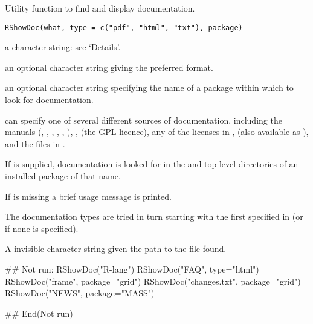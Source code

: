 %
\begin{Description}\relax
Utility function to find and display \R{} documentation.
\end{Description}
%
\begin{Usage}
\begin{verbatim}
RShowDoc(what, type = c("pdf", "html", "txt"), package)
\end{verbatim}
\end{Usage}
%
\begin{Arguments}
\begin{ldescription}
\item[\code{what}] a character string: see `Details'.
\item[\code{type}] an optional character string giving the preferred format.
\item[\code{package}] an optional character string specifying the name of a
package within which to look for documentation.
\end{ldescription}
\end{Arguments}
%
\begin{Details}\relax
{} can specify one of several different sources of documentation,
including the \R{} manuals (, , ,
, , ), ,
 (the GPL licence), any of the licenses in
,  (also available as
), and the files in .

If  is supplied, documentation is looked for in the
 and top-level directories of an installed package of that name.

If  is missing a brief usage message is printed.

The documentation types are tried in turn starting with the first
specified in  (or  if none is specified).
\end{Details}
%
\begin{Value}
A invisible character string given the path to the file found.
\end{Value}
%
\begin{Examples}
\begin{ExampleCode}
## Not run: 
RShowDoc("R-lang")
RShowDoc("FAQ", type="html")
RShowDoc("frame", package="grid")
RShowDoc("changes.txt", package="grid")
RShowDoc("NEWS", package="MASS")

## End(Not run)
\end{ExampleCode}
\end{Examples}
